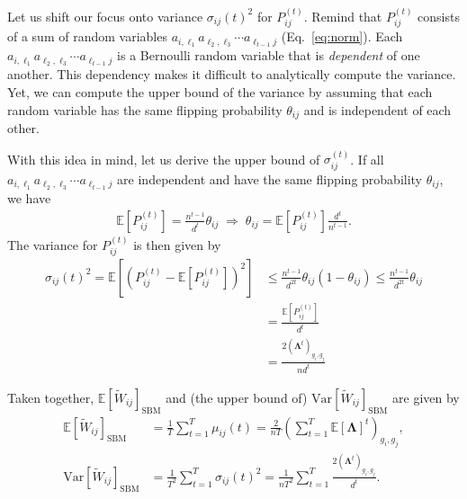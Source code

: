 \documentclass[12pt]{article} %
\def\mat#1{\mathbf{#1}}
\def\Exp{{\mathbb E}}
\def\Var{\text{Var}}
\begin{document}
Let us shift our focus onto variance $\sigma_{ij}(t)^2$ for $P_{ij} ^{(t)}$.
Remind that $P_{ij} ^{(t)}$ consists of a sum of random variables $a_{i,\ell_1}a_{\ell_2,\ell_3} \cdots a_{\ell_{t-1}j}$ (Eq.~\eqref{eq:norm}).
Each $a_{i,\ell_1}a_{\ell_2,\ell_3} \cdots a_{\ell_{t-1}j}$ is a Bernoulli random variable that is \textit{dependent} of one another.
This dependency makes it difficult to analytically compute the variance.
Yet, we can compute the upper bound of the variance by assuming that each random variable has the same flipping probability $\theta_{ij}$ and is independent of each other.

With this idea in mind, let us derive the upper bound of $\sigma_{ij} ^{(t)}$.
If all $a_{i,\ell_1}a_{\ell_2,\ell_3} \cdots a_{\ell_{t-1}j}$ are independent and have the same flipping probability $\theta_{ij}$, we have
\begin{align}
    \Exp\left[ P_{ij}^{(t)} \right] = \frac{n^{t-1}}{d^t}\theta_{ij} \;
    \Rightarrow\; \theta_{ij}  = \Exp\left[ P_{ij}^{(t)} \right] \frac{d^t}{n^{t-1}}.
\end{align}
The variance for $P_{ij}^{(t)}$ is then given by
\begin{align}
    \label{eq:variance_2}
    \sigma_{ij}(t)^2 = \Exp\left[ \left( P_{ij}^{(t)} - \Exp\left[ P_{ij}^{(t)} \right] \right)^2 \right]
     & \leq \frac{n^{t-1}}{d^{2t}}\theta_{ij}(1-\theta_{ij})
    \leq \frac{n^{t-1}}{d^{2t}}\theta_{ij}                         \\
     & = \frac{\Exp\left[ P_{ij}^{(t)} \right]}{d^t}               \\
     & = \frac{ 2\left(\mat{\Lambda} ^t \right)_{g_i, g_j}}{n d^t}
\end{align}

Taken together, $\Exp[\tilde W_{ij}]_{\text{SBM}}$ and (the upper bound of) $\Var[\tilde W_{ij}]_{\text{SBM}}$ are given by
\begin{align}
    \Exp\left[ \tilde W_{ij} \right]_{\text{SBM}} & = \frac{1}{T} \sum_{t=1}^T \mu_{ij}(t)
    = \frac{2}{nT} \left( \sum_{t=1}^T \Exp\left[ \mat{\Lambda}\right]^t\right)_{g_i, g_j}, \label{eq:ewij} \\
    \Var\left[\tilde W_{ij}\right]_{\text{SBM}}   & = \frac{1}{T^2} \sum_{t=1}^T \sigma_{ij}(t)^2
    = \frac{1}{nT^2} \sum_{t=1}^T \frac{ 2\left(\mat{\Lambda} ^t \right)_{g_i, g_j}}{d^t}.  \label{eq:vwij}
\end{align}
\end{document}
